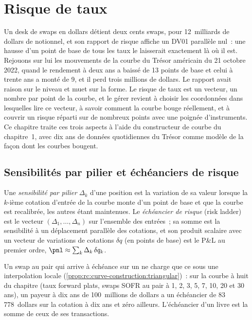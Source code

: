 \chapter{Risque de taux}\label{ch:rc:rates-risk}

Un desk de swaps en dollars détient deux cents swaps, pour 12~milliards de dollars de notionnel, et son
rapport de risque affiche un DV01 parallèle nul~: une hausse d'un point de base de tous les
taux le laisserait exactement là où il est. Rejouons sur lui les mouvements de la courbe du Trésor
américain du 21 octobre 2022, quand le rendement à deux ans a baissé de 13 points de base et
celui à trente ans a monté de 9, et il perd trois millions de dollars. Le rapport avait raison
sur le niveau et muet sur la forme. Le risque de taux est un vecteur, un nombre par point de la
courbe, et le gérer revient à choisir les coordonnées dans lesquelles lire ce vecteur, à savoir
comment la courbe bouge réellement, et à couvrir un risque réparti sur de nombreux points avec
une poignée d'instruments. Ce chapitre traite ces trois aspects à l'aide du constructeur de courbe
du chapitre~1, avec dix ans de données quotidiennes du Trésor comme modèle de la façon dont les
courbes bougent.

\section{Sensibilités par pilier et échéanciers de risque}

\begin{definition}\label{def:rc:rates-risk:ladder}
Une \emph{sensibilité par pilier} $\Delta_k$ d'une
position est la variation de sa valeur lorsque la $k$-ième cotation d'entrée de la courbe
monte d'un point de base et que la courbe est recalibrée, les autres étant maintenues. Le
\emph{échéancier de risque} (risk ladder) est le vecteur $(\Delta_1,\dots,\Delta_n)$
sur l'ensemble des entrées~; sa somme est la sensibilité à un déplacement parallèle des cotations,
et son produit scalaire avec un vecteur de variations de cotations $\delta q$ (en points de base)
est le P\&L au premier ordre, $\pnl\approx\sum_k\Delta_k\,\delta q_k$.
\end{definition}

Un swap au pair qui arrive à échéance sur un  ne charge que ce  sous une
interpolation locale (\cref{prop:rc:curve-construction:triangular})~: sur la courbe à huit  du chapitre
(taux forward plats, swaps SOFR au pair à 1, 2, 3, 5, 7, 10, 20 et
30 ans), un payeur à dix ans de 100~millions de dollars a un échéancier de 83\,778~dollars sur la
cotation à dix ans et zéro ailleurs. L'échéancier d'un livre est la somme de ceux de ses transactions.

